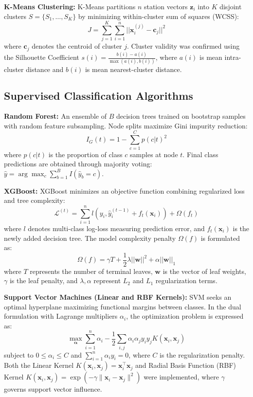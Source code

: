 \documentclass[conference]{IEEEtran}
\begin{document}
\textbf{K-Means Clustering:} K-Means partitions $n$ station vectors $\mathbf{z}_i$ into $K$ disjoint clusters $S = \{S_1, \dots, S_K\}$ by minimizing within-cluster sum of squares (WCSS):
\begin{equation}
J = \sum_{j=1}^{K} \sum_{i=1}^{n} || \mathbf{x}_i^{(j)} - \mathbf{c}_j ||^2
\label{eq:kmeans}
\end{equation}
where $\mathbf{c}_j$ denotes the centroid of cluster $j$. Cluster validity was confirmed using the Silhouette Coefficient $s(i) = \frac{b(i) - a(i)}{\max(a(i), b(i))}$, where $a(i)$ is mean intra-cluster distance and $b(i)$ is mean nearest-cluster distance.

\subsection{Supervised Classification Algorithms}
\textbf{Random Forest:} An ensemble of $B$ decision trees trained on bootstrap samples with random feature subsampling. Node splits maximize Gini impurity reduction:
\begin{equation}
I_G(t) = 1 - \sum_{c=1}^{C} p(c|t)^2
\label{eq:gini}
\end{equation}
where $p(c|t)$ is the proportion of class $c$ samples at node $t$. Final class predictions are obtained through majority voting: $\hat{y} = \arg\max_c \sum_{b=1}^{B} I(\hat{y}_b = c)$.

\textbf{XGBoost:} XGBoost minimizes an objective function combining regularized loss and tree complexity:
\begin{equation}
\mathcal{L}^{(t)} = \sum_{i=1}^{n} l\left(y_i, \hat{y}_i^{(t-1)} + f_t(\mathbf{x}_i)\right) + \Omega(f_t)
\label{eq:xgboost_obj}
\end{equation}
where $l$ denotes multi-class log-loss measuring prediction error, and $f_t(\mathbf{x}_i)$ is the newly added decision tree. The model complexity penalty $\Omega(f)$ is formulated as:
\begin{equation}
\Omega(f) = \gamma T + \frac{1}{2} \lambda ||\mathbf{w}||^2 + \alpha ||\mathbf{w}||_1
\label{eq:xgboost_reg}
\end{equation}
where $T$ represents the number of terminal leaves, $\mathbf{w}$ is the vector of leaf weights, $\gamma$ is the leaf penalty, and $\lambda, \alpha$ represent $L_2$ and $L_1$ regularization terms.

\textbf{Support Vector Machines (Linear and RBF Kernels):} SVM seeks an optimal hyperplane maximizing functional margins between classes. In the dual formulation with Lagrange multipliers $\alpha_i$, the optimization problem is expressed as:
\begin{equation}
\max_{\boldsymbol{\alpha}} \sum_{i=1}^{n}\alpha_i - \frac{1}{2}\sum_{i,j}\alpha_i\alpha_j y_i y_j K(\mathbf{x}_i, \mathbf{x}_j)
\label{eq:svm_dual}
\end{equation}
subject to $0 \le \alpha_i \le C$ and $\sum_{i=1}^{n} \alpha_i y_i = 0$, where $C$ is the regularization penalty. Both the Linear Kernel $K(\mathbf{x}_i, \mathbf{x}_j) = \mathbf{x}_i^\top \mathbf{x}_j$ and Radial Basis Function (RBF) Kernel $K(\mathbf{x}_i, \mathbf{x}_j) = \exp(-\gamma \|\mathbf{x}_i - \mathbf{x}_j\|^2)$ were implemented, where $\gamma$ governs support vector influence.
\end{document}

